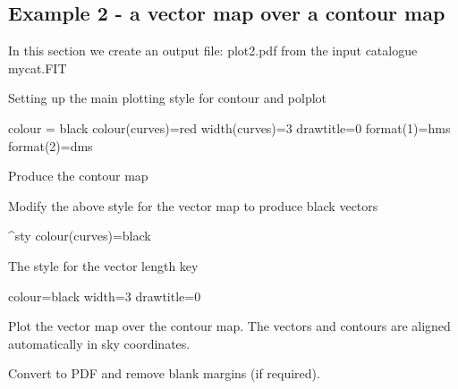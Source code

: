 \subsection{ Example 2 - a vector map over a contour map}
\label{section:kappa-example2}


In this section we create an output file: plot2.pdf from the input catalogue mycat.FIT

\begin{terminalv}
\end{terminalv}

Setting up the main plotting style for contour and polplot

\begin{terminalv}
colour = black
colour(curves)=red
width(curves)=3
drawtitle=0
format(1)=hms
format(2)=dms
\end{terminalv}


Produce the contour map

\begin{terminalv}
\end{terminalv}


Modify the above style for the vector map to produce black vectors

\begin{terminalv}
^sty
colour(curves)=black
\end{terminalv}


The style for the vector length key


\begin{terminalv}
colour=black
width=3
drawtitle=0
\end{terminalv}

Plot the vector map over the contour map. The vectors and
contours are aligned automatically in sky coordinates.


\begin{terminalv}
\end{terminalv}

Convert to PDF and remove blank margins (if required).

\begin{terminalv}
\end{terminalv}

